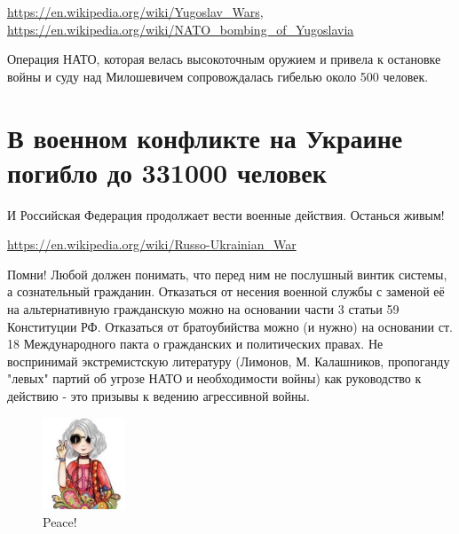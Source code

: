\documentclass[10pt,a4paper]{article}
\begin{document}
	\href{https://en.wikipedia.org/wiki/Yugoslav\_Wars}
	{https://en.wikipedia.org/wiki/Yugoslav\_Wars},
	\href{https://en.wikipedia.org/wiki/NATO\_bombing\_of\_Yugoslavia}
	{https://en.wikipedia.org/wiki/NATO\_bombing\_of\_Yugoslavia}

	Операция НАТО, которая велась высокоточным оружием
	и привела к остановке войны и суду над Милошевичем сопровождалась
	гибелью около 500 человек.
			
	\section{В военном конфликте на Украине погибло до 331000 человек}
	
	И Российская Федерация продолжает вести военные действия.
	Останься живым!
	
	\href{https://en.wikipedia.org/wiki/Russo-Ukrainian\_War}
	{https://en.wikipedia.org/wiki/Russo-Ukrainian\_War}
	
	Помни! Любой должен понимать, что перед ним не послушный винтик
	системы, а сознательный гражданин.
	Отказаться от несения военной службы с заменой её на
	альтернативную гражданскую можно на основании части 3 статьи 59
	Конституции РФ.
	Отказаться от братоубийства можно (и нужно) на основании ст. 18
	Международного пакта о гражданских и политических правах.
	Не воспринимай экстремистскую литературу (Лимонов, М. Калашников,
	пропоганду "левых" партий об угрозе НАТО и необходимости войны)
	как руководство к действию - это призывы к ведению агрессивной
	войны.
	
	\begin{figure}[b]
		\centering
		\includegraphics[width=70pt]{./pacific_girl.png}
		\caption{Peace!}
		\label{fig:pacific_girl}
	\end{figure}
	
\end{document}
